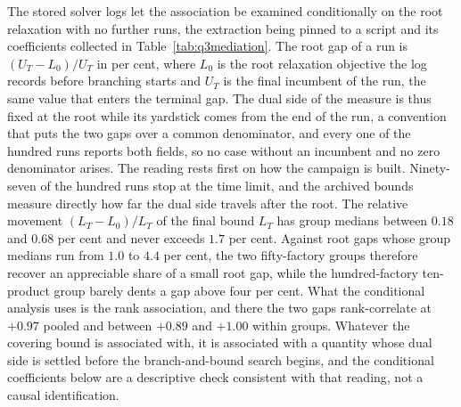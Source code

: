 The stored solver logs let the association be examined conditionally
on the root relaxation
with no further runs, the extraction being pinned to a script and its
coefficients collected in Table~\ref{tab:q3mediation}. The root gap of
a run is $(U_T-L_0)/U_T$ in per cent, where $L_0$ is the root
relaxation objective the log records before branching starts and $U_T$
is the final incumbent of the run, the same value that enters the
terminal gap. The dual side of the measure is thus fixed at the root
while its yardstick comes from the end of the run, a convention that
puts the two gaps over a common denominator, and every one of the
hundred runs reports both fields, so no case without an incumbent and
no zero denominator arises. The reading rests
first on how the campaign is built. Ninety-seven of the hundred runs
stop at the time limit, and the archived bounds measure directly how
far the dual side travels after the root. The relative movement
$(L_T-L_0)/L_T$ of the final bound $L_T$ has group medians between
$0.18$ and $0.68$ per cent and never exceeds $1.7$ per cent. Against
root gaps whose group medians run from $1.0$ to $4.4$ per cent, the
two fifty-factory groups therefore recover an appreciable share of a
small root gap, while the hundred-factory ten-product group barely dents a
gap above four per cent. What the conditional analysis uses is the
rank association, and there the two gaps rank-correlate at
$+0.97$ pooled and between $+0.89$ and $+1.00$ within groups. Whatever
the covering bound is associated with, it is associated with a
quantity whose dual side is settled before the branch-and-bound search
begins, and the conditional coefficients below are a descriptive check
consistent with that reading, not a causal identification.



